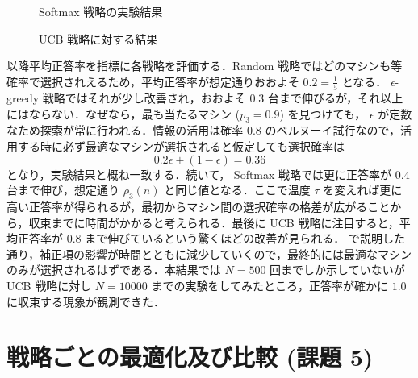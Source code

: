 \documentclass{jsarticle}
\newlength{\figwidth}
\begin{document}
\begin{figure}[H]
\centering
{}
\caption{Softmax 戦略の実験結果}\label{fig:res:sm}
\end{figure}

\begin{figure}[H]
\centering
{}
\caption{UCB 戦略に対する結果}\label{fig:res:ucb}
\end{figure}

以降平均正答率を指標に各戦略を評価する．Random 戦略ではどのマシンも等確率で選択されえるため，平均正答率が想定通りおおよそ $0.2 = \frac{1}{5}$ となる． $\epsilon$-greedy 戦略ではそれが少し改善され，おおよそ $0.3$ 台まで伸びるが，それ以上にはならない．なぜなら，最も当たるマシン ($p_3 = 0.9$) を見つけても， $\epsilon$ が定数なため探索が常に行われる．情報の活用は確率 $0.8$ のベルヌーイ試行なので，活用する時に必ず最適なマシンが選択されると仮定しても選択確率は
\begin{equation}
  0.2\epsilon + (1 - \epsilon) = 0.36
\end{equation}
となり，実験結果と概ね一致する．続いて， Softmax 戦略では更に正答率が $0.4$ 台まで伸び，想定通り $\rho_3(n)$ と同じ値となる．ここで温度 $\tau$ を変えれば更に高い正答率が得られるが，最初からマシン間の選択確率の格差が広がることから，収束までに時間がかかると考えられる．最後に UCB 戦略に注目すると，平均正答率が $0.8$ まで伸びているという驚くほどの改善が見られる． で説明した通り，補正項の影響が時間とともに減少していくので，最終的には最適なマシンのみが選択されるはずである．本結果では $N = 500$ 回までしか示していないが UCB 戦略に対し $N = 10000$ までの実験をしてみたところ，正答率が確かに $1.0$ に収束する現象が観測できた．

\section{戦略ごとの最適化及び比較 (課題 5)}\label{sec:k5}
\end{document}
